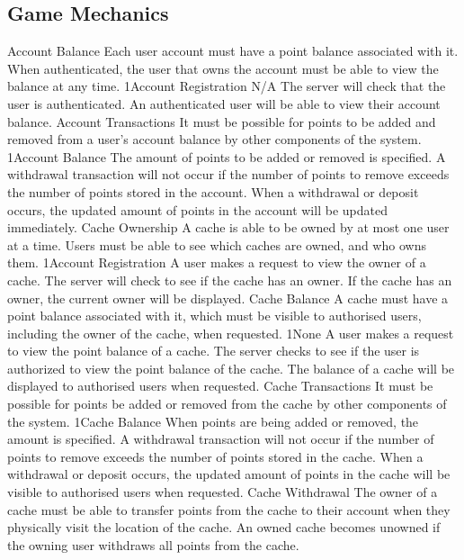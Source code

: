 	\subsection{Game Mechanics}
		\funcreq
			{Account Balance}
			{Each user account must have a point balance associated with it. 
			When authenticated, the user that owns the account must be able to
			view the balance at any time.}
			{1}{Account Registration}
			{N/A}
			{The server will check that the user is authenticated.}
			{An authenticated user will be able to view their account balance.}
		\funcreq
			{Account Transactions}
			{It must be possible for points to be added and removed from a 
			user's account balance by other components of the system.}
			{1}{Account Balance}
			{The amount of points to be added or removed is specified.}
			{A withdrawal transaction will not occur if the number of points 
			to remove exceeds the number of points stored in the account.}
			{When a withdrawal or deposit occurs, the updated amount of points 
			in the account will be updated immediately.}
		\funcreq
			{Cache Ownership}
			{A cache is able to be owned by at most one user at a time. Users 
			must be able to see which caches are owned, and who owns them.}
			{1}{Account Registration}
			{A user makes a request to view the owner of a cache.}
			{The server will check to see if the cache has an owner.}
			{If the cache has an owner, the current owner will be displayed.}
		\funcreq
			{Cache Balance}
			{A cache must have a point balance associated with it, which must 
			be visible to authorised users, including the owner of the cache,
			when requested.}
			{1}{None}
			{A user makes a request to view the point balance of a cache.}
			{The server checks to see if the user is authorized to view the 
			point balance of the cache.}
			{The balance of a cache will be displayed to authorised users when 
			requested.}
		\funcreq
			{Cache Transactions}
			{It must be possible for points be added or removed from the cache
			by other components of the system.}
			{1}{Cache Balance}
			{When points are being added or removed, the amount is specified.}
			{A withdrawal transaction will not occur if the number of points 
			to remove exceeds the number of points stored in the cache.}
			{When a withdrawal or deposit occurs, the updated amount of points 
			in the cache will be visible to authorised users when requested.}
		\funcreq
			{Cache Withdrawal}
			{The owner of a cache must be able to transfer points from the 
			cache to their account when they physically visit the location of 
			the cache. An owned cache becomes unowned if the owning user 
			withdraws all points from the cache.}
